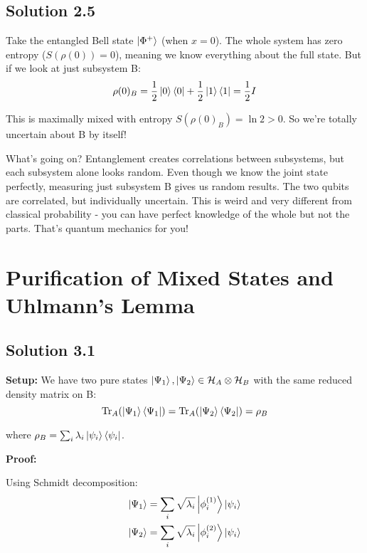 \documentclass[11pt]{article}
\begin{document}
\subsection{Solution 2.5}

Take the entangled Bell state $\ket{\Phi^+}$ (when $x=0$). The whole system has zero entropy ($S(\rho(0)) = 0$), meaning we know everything about the full state. But if we look at just subsystem B:
\begin{equation*}
    \rho(0)_B = \frac{1}{2}\ket{0}\bra{0} + \frac{1}{2}\ket{1}\bra{1} = \frac{1}{2}I
\end{equation*}

This is maximally mixed with entropy $S(\rho(0)_B) = \ln 2 > 0$. So we're totally uncertain about B by itself!

What's going on? Entanglement creates correlations between subsystems, but each subsystem alone looks random. Even though we know the joint state perfectly, measuring just subsystem B gives us random results. The two qubits are correlated, but individually uncertain. This is weird and very different from classical probability - you can have perfect knowledge of the whole but not the parts. That's quantum mechanics for you!

\clearpage

\section{Purification of Mixed States and Uhlmann's Lemma}

\subsection{Solution 3.1}

\textbf{Setup:} We have two pure states $\ket{\Psi_1}, \ket{\Psi_2} \in \mathcal{H}_A \otimes \mathcal{H}_B$ with the same reduced density matrix on B:
\begin{equation*}
    \Tr_A(\ket{\Psi_1}\bra{\Psi_1}) = \Tr_A(\ket{\Psi_2}\bra{\Psi_2}) = \rho_B
\end{equation*}

where $\rho_B = \sum_i \lambda_i \ket{\psi_i}\bra{\psi_i}$.

\textbf{Proof:}

Using Schmidt decomposition:
\begin{align*}
    \ket{\Psi_1} &= \sum_i \sqrt{\lambda_i} \ket{\phi_i^{(1)}} \ket{\psi_i} \\
    \ket{\Psi_2} &= \sum_i \sqrt{\lambda_i} \ket{\phi_i^{(2)}} \ket{\psi_i}
\end{align*}
\end{document}

